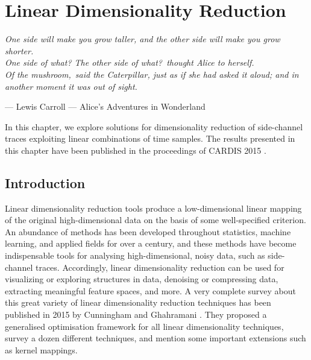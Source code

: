
\chapter{Linear Dimensionality Reduction} 
\label{ChapterLinear}
\setlength{\epigraphwidth}{0.7\textwidth}
\epigraph{\textit{\textquotedbl One side will make you grow taller, and the
other side will make you grow shorter.\textquotedbl \\
\textquotedbl One side of what? The other side of what?\textquotedbl \ thought Alice to herself.\\
\textquotedbl Of the mushroom,\textquotedbl \ said the Caterpillar, just as if she had asked it aloud; and
in another moment it was out of sight.}}{--- \textup{Lewis Carroll --- \textquotedbl Alice's Adventures in Wonderland\textquotedbl}}


In this chapter, we explore solutions for dimensionality reduction of side-channel traces exploiting linear combinations of time samples. The results presented in this chapter have been published in the proceedings of CARDIS 2015 \cite{Cagli2016}.

\section{Introduction}\label{sec:intro_chapter_linear}
Linear dimensionality reduction tools produce a low-dimensional linear mapping of the original high-dimensional data on the basis of some well-specified criterion. An abundance of methods has been developed throughout statistics, machine learning, and applied fields for over a century, and these methods have become indispensable tools for analysing high-dimensional, noisy data, such as side-channel traces.  Accordingly, linear dimensionality reduction can be used for visualizing or exploring structures in data, denoising or compressing data, extracting meaningful feature spaces, and more. A very complete survey about this great variety of linear dimensionality reduction techniques has been published in 2015 by Cunningham and Ghahramani \cite{cunningham2015linear}. They proposed a generalised optimisation framework for all linear dimensionality techniques, survey a dozen different techniques, and mention some important extensions such as kernel mappings. \\

